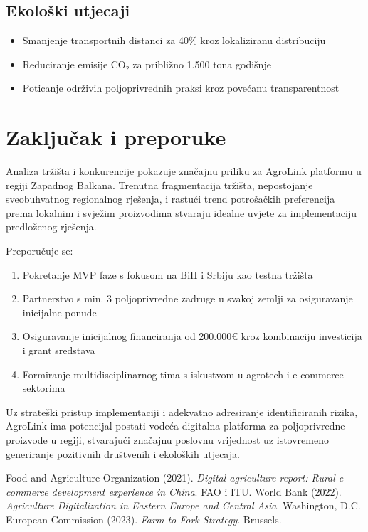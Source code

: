 \documentclass[a4paper,12pt]{article}
\begin{document}
\subsection{Ekološki utjecaji}
\begin{itemize}
    \item Smanjenje transportnih distanci za 40\% kroz lokaliziranu distribuciju
    \item Reduciranje emisije CO₂ za približno 1.500 tona godišnje
    \item Poticanje održivih poljoprivrednih praksi kroz povećanu transparentnost
\end{itemize}

\section{Zaključak i preporuke}
\label{sec:zakljucak}

Analiza tržišta i konkurencije pokazuje značajnu priliku za AgroLink platformu u regiji Zapadnog Balkana. Trenutna fragmentacija tržišta, nepostojanje sveobuhvatnog regionalnog rješenja, i rastući trend potrošačkih preferencija prema lokalnim i svježim proizvodima stvaraju idealne uvjete za implementaciju predloženog rješenja.

Preporučuje se:
\begin{enumerate}
    \item Pokretanje MVP faze s fokusom na BiH i Srbiju kao testna tržišta
    \item Partnerstvo s min. 3 poljoprivredne zadruge u svakoj zemlji za osiguravanje inicijalne ponude
    \item Osiguravanje inicijalnog financiranja od 200.000€ kroz kombinaciju investicija i grant sredstava
    \item Formiranje multidisciplinarnog tima s iskustvom u agrotech i e-commerce sektorima
\end{enumerate}

Uz strateški pristup implementaciji i adekvatno adresiranje identificiranih rizika, AgroLink ima potencijal postati vodeća digitalna platforma za poljoprivredne proizvode u regiji, stvarajući značajnu poslovnu vrijednost uz istovremeno generiranje pozitivnih društvenih i ekoloških utjecaja.

\begin{thebibliography}{99}
 Food and Agriculture Organization (2021). \textit{Digital agriculture report: Rural e-commerce development experience in China}. FAO i ITU.
 World Bank (2022). \textit{Agriculture Digitalization in Eastern Europe and Central Asia}. Washington, D.C.
 European Commission (2023). \textit{Farm to Fork Strategy}. Brussels.
\end{thebibliography}
\end{document}
